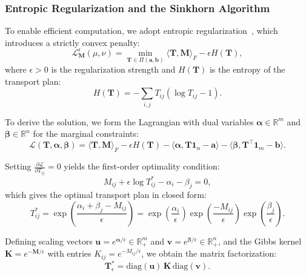 \subsubsection{Entropic Regularization and the Sinkhorn Algorithm}

To enable efficient computation, we adopt entropic regularization~\citep{cuturi2013sinkhorn}, which introduces a strictly convex penalty:
\begin{equation}
    \label{eq:entropic_ot}
    \mathcal{L}^\epsilon_{\mathbf{M}}(\mu, \nu) = \min_{\mathbf{T} \in \Pi(\mathbf{a}, \mathbf{b})} \langle \mathbf{T}, \mathbf{M} \rangle_F - \epsilon H(\mathbf{T}),
\end{equation}
where $\epsilon > 0$ is the regularization strength and $H(\mathbf{T})$ is the entropy of the transport plan:
\begin{equation}
    H(\mathbf{T}) = -\sum_{i,j} T_{ij}(\log T_{ij} - 1).
\end{equation}

To derive the solution, we form the Lagrangian with dual variables $\boldsymbol{\alpha} \in \mathbb{R}^m$ and $\boldsymbol{\beta} \in \mathbb{R}^n$ for the marginal constraints:
\begin{equation}
    \mathcal{L}(\mathbf{T}, \boldsymbol{\alpha}, \boldsymbol{\beta}) = \langle \mathbf{T}, \mathbf{M} \rangle_F - \epsilon H(\mathbf{T}) - \langle \boldsymbol{\alpha}, \mathbf{T}\mathbf{1}_n - \mathbf{a} \rangle - \langle \boldsymbol{\beta}, \mathbf{T}^\top\mathbf{1}_m - \mathbf{b} \rangle.
\end{equation}

Setting $\frac{\partial \mathcal{L}}{\partial T_{ij}} = 0$ yields the first-order optimality condition:
\begin{equation}
    M_{ij} + \epsilon \log T^*_{ij} - \alpha_i - \beta_j = 0,
\end{equation}
which gives the optimal transport plan in closed form:
\begin{equation}
    \label{eq:optimal_plan_form}
    T^*_{ij} = \exp\left(\frac{\alpha_i + \beta_j - M_{ij}}{\epsilon}\right) = \exp\left(\frac{\alpha_i}{\epsilon}\right) \exp\left(\frac{-M_{ij}}{\epsilon}\right) \exp\left(\frac{\beta_j}{\epsilon}\right).
\end{equation}

Defining scaling vectors $\mathbf{u} = e^{\boldsymbol{\alpha}/\epsilon} \in \mathbb{R}^m_+$ and $\mathbf{v} = e^{\boldsymbol{\beta}/\epsilon} \in \mathbb{R}^n_+$, and the Gibbs kernel $\mathbf{K} = e^{-\mathbf{M}/\epsilon}$ with entries $K_{ij} = e^{-M_{ij}/\epsilon}$, we obtain the matrix factorization:
\begin{equation}
    \mathbf{T}^*_\epsilon = \text{diag}(\mathbf{u}) \, \mathbf{K} \, \text{diag}(\mathbf{v}).
\end{equation}

